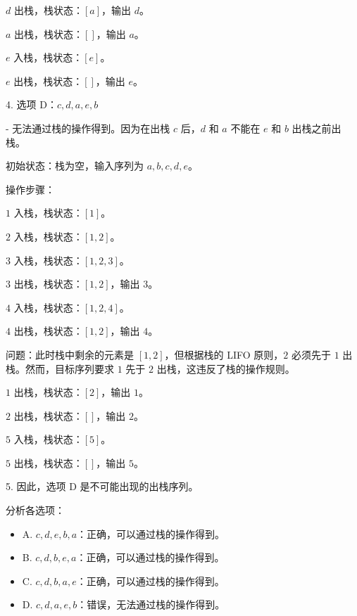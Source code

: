 \documentclass[lang=cn,newtx,10pt,scheme=chinese]{../../../elegantbook}
\begin{document}
\begin{enumerate}
                    $d$ 出栈，栈状态：$[a]$，输出 $d$。
        
                    $a$ 出栈，栈状态：$[]$，输出 $a$。
        
                    $e$ 入栈，栈状态：$[e]$。
        
                    $e$ 出栈，栈状态：$[]$，输出 $e$。

    4. 选项 D：$c, d, a, e, b$

            - 无法通过栈的操作得到。因为在出栈 $c$ 后，$d$ 和 $a$ 不能在 $e$ 和 $b$ 出栈之前出栈。
        
            初始状态：栈为空，输入序列为 $a, b, c, d, e$。
        
            操作步骤：
        
            $1$ 入栈，栈状态：$[1]$。
        
            $2$ 入栈，栈状态：$[1, 2]$。
        
            $3$ 入栈，栈状态：$[1, 2, 3]$。
        
            $3$ 出栈，栈状态：$[1, 2]$，输出 $3$。
        
            $4$ 入栈，栈状态：$[1, 2, 4]$。
        
            $4$ 出栈，栈状态：$[1, 2]$，输出 $4$。
        
            问题：此时栈中剩余的元素是 $[1, 2]$，但根据栈的 LIFO 原则，$2$ 必须先于 $1$ 出栈。然而，目标序列要求 $1$ 先于 $2$ 出栈，这违反了栈的操作规则。

            $1$ 出栈，栈状态：$[2]$，输出 $1$。

            $2$ 出栈，栈状态：$[]$，输出 $2$。

            $5$ 入栈，栈状态：$[5]$。

            $5$ 出栈，栈状态：$[]$，输出 $5$。

    5. 因此，选项 D 是不可能出现的出栈序列。

    分析各选项：
    \begin{itemize}
        \item A. $c, d, e, b, a$：正确，可以通过栈的操作得到。
        
        \item B. $c, d, b, e, a$：正确，可以通过栈的操作得到。
        
        \item C. $c, d, b, a, e$：正确，可以通过栈的操作得到。
        
        \item D. $c, d, a, e, b$：错误，无法通过栈的操作得到。
    \end{itemize}

\end{enumerate}
\end{document}
